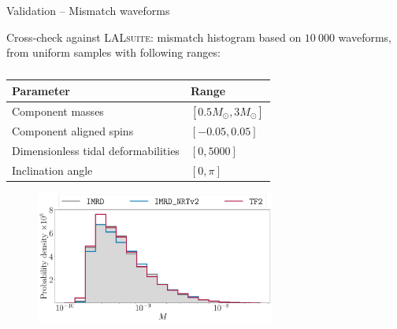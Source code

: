 \documentclass[usenames,dvipsnames,t]{beamer}
\begin{document}
\begin{frame}{Validation -- Mismatch waveforms}

  Cross-check against \textsc{LALsuite}: mismatch histogram based on $10 \ 000$ waveforms, from uniform samples with following ranges:

  \footnotesize
  \begin{table}
    \centering
    \renewcommand{\arraystretch}{1.0}
    \begin{tabular}{l l} 
        \hline\hline
        Parameter & Range \\
        \hline
        Component masses & $[0.5M_{\odot}, 3M_{\odot}]$\\
        Component aligned spins & $[-0.05, 0.05]$\\
        Dimensionless tidal deformabilities &  $[0, 5000]$\\
        Inclination angle & $[0, \pi]$\\
        \hline\hline
    \end{tabular}
    \caption*{}
\end{table}
\normalsize

\vspace{-11.75mm}

  \begin{figure}
    \centering
    \includegraphics[width=0.7\textwidth]{Figures/mismatch_histogram.pdf}
    \caption*{}
  \end{figure}
  
\end{frame}
\end{document}
